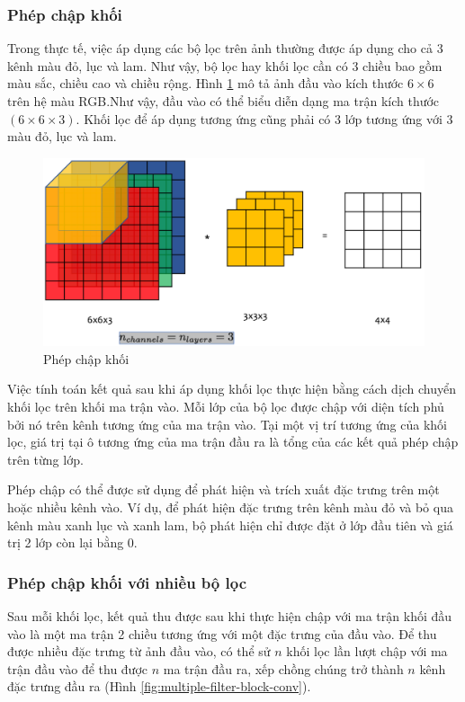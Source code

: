 \subsubsection{Phép chập khối}

Trong thực tế, việc áp dụng các bộ lọc trên ảnh thường được áp dụng cho cả 3 kênh màu đỏ, lục và lam. Như vậy, bộ lọc hay khối lọc cần có 3 chiều bao gồm màu sắc, chiều cao và chiều rộng. Hình \ref{fig:single-filter-block-conv} mô tả ảnh đầu vào kích thước $6 \times 6$ trên hệ màu RGB.Như vậy, đầu vào có thể biểu diễn dạng ma trận kích thước $(6 \times 6 \times 3)$. Khối lọc để áp dụng tương ứng cũng phải có 3 lớp tương ứng với 3 màu đỏ, lục và lam.

\begin{figure}[h]
	\centering
	\includegraphics[width=0.8\linewidth]{images/single-filter-block-conv}
	\caption{Phép chập khối \cite{dl_app_2018}}
	\label{fig:single-filter-block-conv}
\end{figure}

Việc tính toán kết quả sau khi áp dụng khối lọc thực hiện bằng cách dịch chuyển khối lọc trên khối ma trận vào. Mỗi lớp của bộ lọc được chập với diện tích phủ bởi nó trên kênh tương ứng của ma trận vào. Tại một vị trí tương ứng của khối lọc, giá trị tại ô tương ứng của ma trận đầu ra là tổng của các kết quả phép chập trên từng lớp.

Phép chập có thể được sử dụng để phát hiện và trích xuất đặc trưng trên một hoặc nhiều kênh vào. Ví dụ, để phát hiện đặc trưng trên kênh màu đỏ và bỏ qua kênh màu xanh lục và xanh lam, bộ phát hiện chỉ được đặt ở lớp đầu tiên và giá trị 2 lớp còn lại bằng 0.

\subsubsection{Phép chập khối với nhiều bộ lọc}

Sau mỗi khối lọc, kết quả thu được sau khi thực hiện chập với ma trận khối đầu vào là một ma trận 2 chiều tương ứng với một đặc trưng của đầu vào. Để thu được nhiều đặc trưng từ ảnh đầu vào, có thể sử $n$ khối lọc lần lượt chập với ma trận đầu vào để thu được $n$ ma trận đầu ra, xếp chồng chúng trở thành $n$ kênh đặc trưng đầu ra (Hình \ref{fig:multiple-filter-block-conv}).

